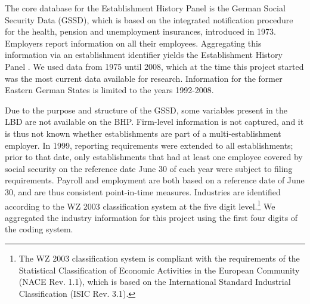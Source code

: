 
The core database for the Establishment History Panel is the German Social Security Data  (GSSD), which is based on the integrated notification procedure for the health, pension and unemployment insurances,   introduced in  1973. Employers report information on all their employees. Aggregating this information via an establishment identifier yields the Establishment History Panel \citep[German abbreviation: BHP]{BHP}. We used data from  1975 until 2008, which at the time this project started was the most current data available for research. Information for the former Eastern German States is limited to the years 1992-2008. 

Due to the purpose and structure of the GSSD, some variables present in the \ac{LBD} are not available on the  \ac{BHP}. Firm-level information is not captured, and it is thus not known whether establishments are part of a multi-establishment employer. In 1999, reporting requirements were extended to all establishments; prior to that date, only establishments that  had at least one employee covered by social security on the reference date June 30 of each year were subject to filing requirements. Payroll and employment are both based on a reference date of June 30, and are thus consistent point-in-time measures. 
Industries are identified according to the WZ 2003 classification system \citep{WZ2003} at the five digit level.\footnote{The WZ 2003 classification system is compliant with the requirements of the Statistical Classification of Economic Activities in the European Community (NACE Rev. 1.1), which is based on the International Standard Industrial Classification (ISIC Rev. 3.1).} We aggregated the industry information for this project  using the first four digits of the coding system.




